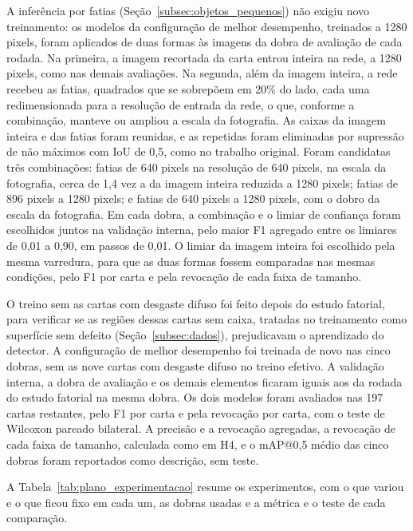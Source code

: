 \documentclass[
    12pt,                %
    openright,           %
    oneside,             %
    a4paper,             %
    english,             %
    brazil               %
]{abntex2}
\begin{document}
A inferência por fatias (Seção~\ref{subsec:objetos_pequenos}) não
exigiu novo treinamento: os modelos da configuração de melhor
desempenho, treinados a 1280 pixels, foram aplicados de duas formas às
imagens da dobra de avaliação de cada rodada. Na primeira, a imagem
recortada da carta entrou inteira na rede, a 1280 pixels, como nas
demais avaliações. Na segunda, além da imagem inteira, a rede recebeu
as fatias, quadrados que se sobrepõem em 20\% do lado, cada uma
redimensionada para a resolução de entrada da rede, o que, conforme a
combinação, manteve ou ampliou a escala da fotografia. As caixas da imagem inteira e das
fatias foram reunidas, e as repetidas foram eliminadas por supressão de
não máximos com IoU de 0,5, como no trabalho original. Foram candidatas
três combinações: fatias de 640 pixels na resolução de 640 pixels, na
escala da fotografia, cerca de 1,4 vez a da imagem inteira reduzida a
1280 pixels; fatias de 896 pixels a 1280 pixels; e fatias de 640
pixels a 1280 pixels, com o dobro da escala da fotografia. Em cada
dobra, a combinação e o limiar de confiança foram escolhidos juntos na
validação interna, pelo maior F1 agregado entre os limiares de 0,01 a
0,90, em passos de 0,01. O limiar da imagem inteira foi escolhido pela
mesma varredura, para que as duas formas fossem comparadas nas mesmas
condições, pelo F1 por carta e pela revocação de cada faixa de tamanho.

O treino sem as cartas com desgaste difuso foi feito depois do estudo
fatorial, para verificar se as regiões dessas cartas sem caixa, tratadas
no treinamento como superfície sem defeito (Seção~\ref{subsec:dados}),
prejudicavam o aprendizado do detector. A configuração de melhor
desempenho foi treinada de novo nas cinco dobras, sem as nove cartas com
desgaste difuso no treino efetivo. A validação interna, a dobra de
avaliação e os demais elementos ficaram iguais aos da rodada do estudo
fatorial na mesma dobra. Os dois modelos foram avaliados nas 197 cartas
restantes, pelo F1 por carta e pela revocação por carta, com o teste
de Wilcoxon pareado bilateral. A
precisão e a revocação agregadas, a revocação de cada faixa de tamanho,
calculada como em H4, e o mAP@0,5 médio das cinco dobras foram
reportados como descrição, sem teste.

A Tabela~\ref{tab:plano_experimentacao} resume os experimentos, com o
que variou e o que ficou fixo em cada um, as dobras usadas e a métrica
e o teste de cada comparação.
\end{document}

